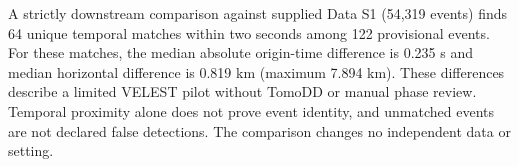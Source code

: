 A strictly downstream comparison against supplied Data S1 (54,319 events) finds 64 unique temporal matches within two seconds among 122 provisional events. For these matches, the median absolute origin-time difference is 0.235 s and median horizontal difference is 0.819 km (maximum 7.894 km). These differences describe a limited VELEST pilot without TomoDD or manual phase review. Temporal proximity alone does not prove event identity, and unmatched events are not declared false detections. The comparison changes no independent data or setting.
